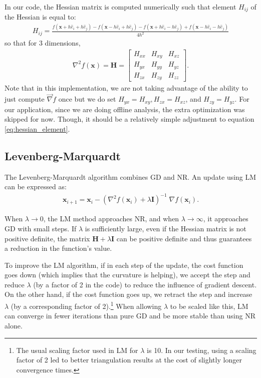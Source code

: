 \documentclass[11pt, letterpaper]{extarticle} %
\begin{document}
In our code, the Hessian matrix is computed numerically such that element $H_{ij}$ of the Hessian is equal to:
\begin{align}\label{eq:hessian_element}
    H_{ij} = \frac{f(\mathbf{x} + h \hat{e}_i + h \hat{e}_j) - f(\mathbf{x} - h \hat{e}_i + h \hat{e}_j) - f(\mathbf{x} + h \hat{e}_i - h \hat{e}_j) + f(\mathbf{x} - h \hat{e}_i - h \hat{e}_j)}{4h^2}
\end{align}
so that for 3 dimensions,
\begin{align}
    \nabla^2 f(\mathbf{x}) = \mathbf{H} = 
    \begin{bmatrix}
    H_{xx} & H_{xy} & H_{xz} \\
    H_{yx} & H_{yy} & H_{yz} \\
    H_{zx} & H_{zy} & H_{zz} 
    \end{bmatrix}.
\end{align}
Note that in this implementation, we are not taking advantage of the ability to just compute $\overrightarrow{\nabla}f$ once but we do set $H_{yx} = H_{xy}, H_{zx} = H_{xz}$, and $H_{zy} = H_{yz}$. For our application, since we are doing offline analysis, the extra optimization was skipped for now. Though, it should be a relatively simple adjustment to equation \ref{eq:hessian_element}.

\subsection{Levenberg-Marquardt}\label{subsec:levenberg-marquardt}
The Levenberg-Marquardt algorithm combines GD and NR. An update using LM can be expressed as:
\begin{align}
    \mathbf{x}_{i+1} = \mathbf{x}_i - \left( \nabla^2 f(\mathbf{x}_i) + \lambda \mathbf{I} \right)^{-1} \; \nabla f(\mathbf{x}_i).
\end{align}

When $\lambda \rightarrow 0$, the LM method approaches NR, and when $\lambda \rightarrow \infty$, it approaches GD with small steps. If $\lambda$ is sufficiently large, even if the Hessian matrix is not positive definite, the matrix $\mathbf{H} + \lambda \mathbf{I}$ can be positive definite and thus guarantees a reduction in the function's value.

To improve the LM algorithm, if in each step of the update, the cost function goes down (which implies that the curvature is helping), we accept the step and reduce $\lambda$ (by a factor of 2 in the code) to reduce the influence of gradient descent. On the other hand, if the cost function goes up, we retract the step and increase $\lambda$ (by a corresponding factor of 2).\footnote{The usual scaling factor used in LM for $\lambda$ is 10. In our testing, using a scaling factor of 2 led to better triangulation results at the cost of slightly longer convergence times.} When allowing $\lambda$ to be scaled like this, LM can converge in fewer iterations than pure GD and be more stable than using NR alone. 
\end{document}
